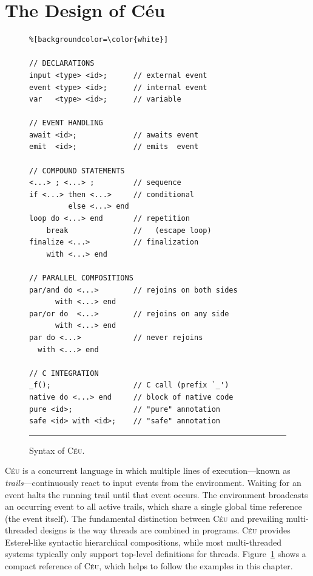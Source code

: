 \documentclass[letterpaper]{sig-alternate}
\newcommand{\CEU}{\textsc{C\'{e}u}\xspace}
\begin{document}
\section{The Design of C\'eu}
\label{sec.ceu}

\begin{figure}[t]
\begin{lstlisting}%[backgroundcolor=\color{white}]

// DECLARATIONS
input <type> <id>;      // external event
event <type> <id>;      // internal event
var   <type> <id>;      // variable

// EVENT HANDLING
await <id>;             // awaits event
emit  <id>;             // emits  event

// COMPOUND STATEMENTS
<...> ; <...> ;         // sequence
if <...> then <...>     // conditional
         else <...> end
loop do <...> end       // repetition
    break               //   (escape loop)
finalize <...>          // finalization
    with <...> end

// PARALLEL COMPOSITIONS
par/and do <...>        // rejoins on both sides
      with <...> end
par/or do  <...>        // rejoins on any side
      with <...> end
par do <...>            // never rejoins
  with <...> end

// C INTEGRATION
_f();                   // C call (prefix `_')
native do <...> end     // block of native code
pure <id>;              // "pure" annotation
safe <id> with <id>;    // "safe" annotation
\end{lstlisting}
\rule{8.5cm}{0.37pt}
\caption{ Syntax of \CEU.\newline
{\small %
}%
\label{lst.syntax}
}
\end{figure}

\CEU is a concurrent language in which multiple lines of execution---known as 
\emph{trails}---continuously react to input events from the environment.
Waiting for an event halts the running trail until that event occurs.
The environment broadcasts an occurring event to all active trails, which share 
a single global time reference (the event itself).
%
%
The fundamental distinction between \CEU and prevailing multi-threaded designs 
is the way threads are combined in programs.
\CEU provides Esterel-like syntactic hierarchical compositions, while most 
multi-threaded systems typically only support top-level definitions for 
threads.
Figure~\ref{lst.syntax} shows a compact reference of \CEU, which helps to 
follow the examples in this chapter.
\end{document}
